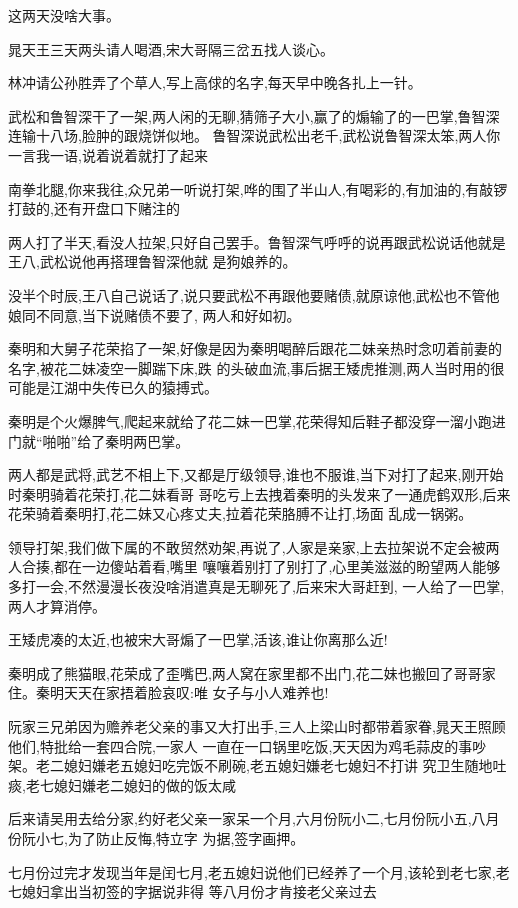 ﻿\documentclass[12pt]{article}
\begin{document}
这两天没啥大事。

晁天王三天两头请人喝酒,宋大哥隔三岔五找人谈心。

林冲请公孙胜弄了个草人,写上高俅的名字,每天早中晚各扎上一针。

武松和鲁智深干了一架,两人闲的无聊,猜筛子大小,赢了的煽输了的一巴掌,鲁智深连输十八场,脸肿的跟烧饼似地。
鲁智深说武松出老千,武松说鲁智深太笨,两人你一言我一语,说着说着就打了起来\dldots

南拳北腿,你来我往,众兄弟一听说打架,哗的围了半山人,有喝彩的,有加油的,有敲锣打鼓的,还有开盘口下赌注的
\dldots

两人打了半天,看没人拉架,只好自己罢手。鲁智深气呼呼的说再跟武松说话他就是王八,武松说他再搭理鲁智深他就
是狗娘养的。

没半个时辰,王八自己说话了,说只要武松不再跟他要赌债,就原谅他,武松也不管他娘同不同意,当下说赌债不要了,
两人和好如初。

秦明和大舅子花荣掐了一架,好像是因为秦明喝醉后跟花二妹亲热时念叨着前妻的名字,被花二妹凌空一脚踹下床,跌
的头破血流,事后据王矮虎推测,两人当时用的很可能是江湖中失传已久的猿搏式。

秦明是个火爆脾气,爬起来就给了花二妹一巴掌,花荣得知后鞋子都没穿一溜小跑进门就``啪啪''给了秦明两巴掌。

两人都是武将,武艺不相上下,又都是厅级领导,谁也不服谁,当下对打了起来,刚开始时秦明骑着花荣打,花二妹看哥
哥吃亏上去拽着秦明的头发来了一通虎鹤双形,后来花荣骑着秦明打,花二妹又心疼丈夫,拉着花荣胳膊不让打,场面
乱成一锅粥。

领导打架,我们做下属的不敢贸然劝架,再说了,人家是亲家,上去拉架说不定会被两人合揍,都在一边傻站着看,嘴里
嚷嚷着别打了别打了,心里美滋滋的盼望两人能够多打一会,不然漫漫长夜没啥消遣真是无聊死了,后来宋大哥赶到,
一人给了一巴掌,两人才算消停。

王矮虎凑的太近,也被宋大哥煽了一巴掌,活该,谁让你离那么近!

秦明成了熊猫眼,花荣成了歪嘴巴,两人窝在家里都不出门,花二妹也搬回了哥哥家住。秦明天天在家捂着脸哀叹:唯
女子与小人难养也!

阮家三兄弟因为赡养老父亲的事又大打出手,三人上梁山时都带着家眷,晁天王照顾他们,特批给一套四合院,一家人
一直在一口锅里吃饭,天天因为鸡毛蒜皮的事吵架。老二媳妇嫌老五媳妇吃完饭不刷碗,老五媳妇嫌老七媳妇不打讲
究卫生随地吐痰,老七媳妇嫌老二媳妇的做的饭太咸\dldots

后来请吴用去给分家,约好老父亲一家呆一个月,六月份阮小二,七月份阮小五,八月份阮小七,为了防止反悔,特立字
为据,签字画押。

七月份过完才发现当年是闰七月,老五媳妇说他们已经养了一个月,该轮到老七家,老七媳妇拿出当初签的字据说非得
等八月份才肯接老父亲过去\dldots
\end{document}
